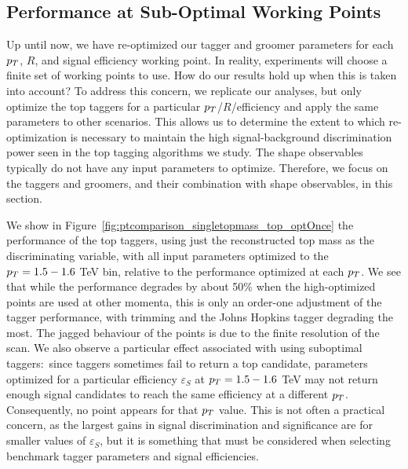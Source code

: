 \subsection{Performance at Sub-Optimal Working Points}

Up until now, we have re-optimized our tagger and groomer parameters for each $p_T$, $R$, and signal efficiency working point. In reality, experiments will choose a finite set of working points to use. How do our results hold up when this is taken into account? To address this concern, we replicate our analyses, but only optimize the top taggers for a particular $p_T$/$R$/efficiency and apply the same parameters to other scenarios. This allows us to determine the extent to which re-optimization is necessary to maintain the high signal-background discrimination power seen in the top tagging algorithms we study. The shape observables typically do not have any input parameters to optimize. Therefore, we focus on the taggers and groomers, and their combination with shape observables, in this section.

We show in Figure~\ref{fig:ptcomparison_singletopmass_top_optOnce} the performance of the top taggers, using just the reconstructed top mass as the discriminating variable, with all input parameters optimized to the $p_T=1.5-1.6$ TeV bin, relative to the performance optimized at each $p_T$. We see that while the performance degrades by about 50\% when the high-\pt optimized points are used at other momenta, this is only an order-one adjustment of the tagger performance, with trimming and the Johns Hopkins tagger degrading the most. The jagged behaviour of the points is due to the finite resolution of the scan. We also observe a particular effect associated with using suboptimal taggers:~since taggers sometimes fail to return a top candidate, parameters optimized for a particular efficiency $\varepsilon_S$ at $p_T=1.5-1.6$ TeV may not return enough signal candidates to reach the same efficiency at a different $p_T$. Consequently, no point appears for that $p_T$ value. This is not often a practical concern, as the largest gains in signal discrimination and significance are for smaller values of $\varepsilon_S$, but it is something that must be considered when selecting benchmark tagger parameters and signal efficiencies.

